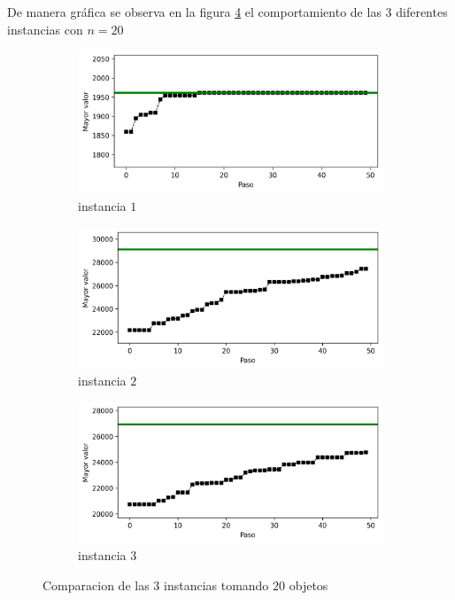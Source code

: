 \documentclass{article}
\begin{document}
De manera gr\'afica se observa en la figura \ref{f3} el comportamiento de las 3 diferentes instancias con $n=20$ 

\begin{figure}[H]
       \centering
       \begin{subfigure}[b]{0.8\linewidth}
           \includegraphics[width=\linewidth]{20i1.png}
           \caption{instancia $1$}
           \label{fig:westminster_lateral}
        \end{subfigure}
        \begin{subfigure}[b]{0.8\linewidth}
            \includegraphics[width=\linewidth]{20i2.png}
            \caption{instancia $2$}
            \label{fig:westminster_aerea}
        \end{subfigure}
        \begin{subfigure}[b]{0.8\linewidth}
           \includegraphics[width=\linewidth]{20i3.png}
           \caption{instancia $3$}
           \label{fig:westminster_aerea}
        \end{subfigure}
        \caption{Comparacion de las $3$ instancias tomando $20$ objetos}
        \label{f3}
\end{figure}
\end{document}
